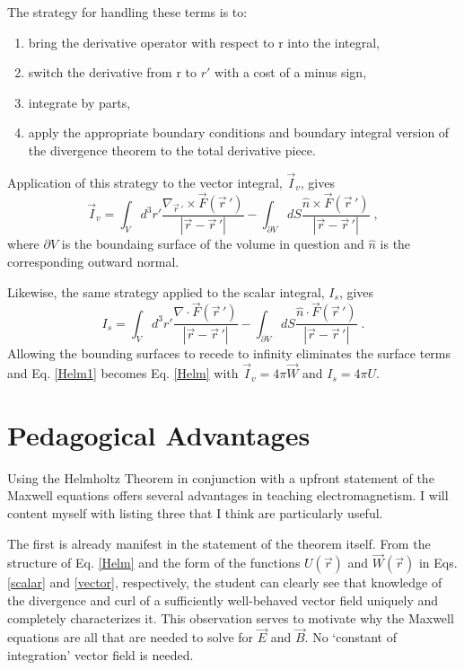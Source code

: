 \documentclass{article}
\begin{document}
The strategy for handling these terms is to:
\begin{enumerate}
  \item bring the derivative operator with respect to r into the integral,
  \item switch the derivative from r to $r'$ with a cost of a minus sign,
  \item integrate by parts,
  \item apply the appropriate boundary conditions and boundary integral version of the divergence theorem to the total derivative piece.
\end{enumerate}
Application of this strategy to the vector integral, $\vec I_v$, gives
\begin{equation}
   \vec I _{v} =   \int_V d^3 r' \frac{ \nabla_{\vec r\,'} \times \vec F (\vec r \, ')}{|\vec r - \vec r\,'|} 
                      - \int_{\partial V} dS \frac{\hat n \times \vec F(\vec r\,')}{|\vec r - \vec r\,'|} \; ,
\end{equation}
where $\partial V$ is the boundaing surface of the volume in question and $\hat n$ is the 
corresponding outward normal.

Likewise, the same strategy applied to the scalar integral, $I_s$, gives
\begin{equation}
        I_{s} =   \int_V d^3 r' \frac{ \nabla \cdot \vec F ( \vec r \,')}{|\vec r - \vec r\,'|} 
                     - \int_{\partial V} dS \frac{\hat n \cdot \vec F ( \vec r \,')}{|\vec r - \vec r\,'|} \; .
\end{equation}
Allowing the bounding surfaces to recede to infinity eliminates the surface terms and Eq. \ref{Helm1} becomes 
Eq. \ref{Helm} with $\vec I_v = 4 \pi \vec W$ and $I_s = 4 \pi U$.

\section{Pedagogical Advantages}

Using the Helmholtz Theorem in conjunction with a upfront statement of the Maxwell equations offers several advantages in 
teaching electromagnetism. I will content myself with listing three that I think are particularly useful.

The first is already manifest in the statement of the theorem itself.  From the structure of Eq. \ref{Helm} and the form
of the functions $U(\vec r)$ and $\vec W(\vec r)$ in Eqs. \! \ref{scalar} and \ref{vector}, respectively, the student can clearly
see that knowledge of the divergence and curl of a sufficiently well-behaved vector field uniquely and completely 
characterizes it.  This observation serves to motivate why the Maxwell equations are all that are needed to solve 
for $\vec E$ and $\vec B$. No `constant of integration' vector field is needed.
\end{document}
